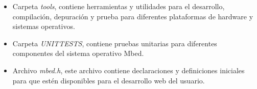 \begin{itemize}
    \item Carpeta \textit{tools}, contiene herramientas y utilidades para el desarrollo, compilación, depuración y prueba para diferentes plataformas de hardware y sistemas operativos.

    \item Carpeta \textit{UNITTESTS}, contiene pruebas unitarias para diferentes componentes del sistema operativo Mbed.

    \item Archivo \textit{mbed.h}, este archivo contiene declaraciones y definiciones iniciales para que estén disponibles para el desarrollo web del usuario. 

\end{itemize}